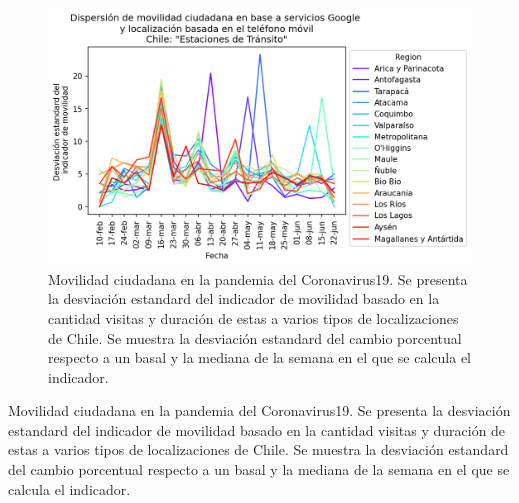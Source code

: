 \documentclass{article}
\begin{document}
\begin{figure}[H]
	\centering
	\begin{adjustbox}{width=0.8\textwidth}
		\includegraphics{./figtab/chile_DS.png} %
	\end{adjustbox}
	\caption{Movilidad ciudadana en la pandemia del Coronavirus19. Se presenta la desviación estandard del indicador de movilidad basado en la cantidad visitas y duración de estas a varios tipos de localizaciones de Chile. Se muestra la desviación estandard del cambio porcentual respecto a un basal y la mediana de la semana en el que se calcula el indicador. }
	\label{fig:movilidad chile_DS}
\end{figure}


\begin{table}[H]
	\begin{adjustbox}{width=1\textwidth}
	\end{adjustbox}
	\caption{Movilidad ciudadana en la pandemia del Coronavirus19. Se presenta la desviación estandard del indicador de movilidad basado en la cantidad visitas y duración de estas a varios tipos de localizaciones de Chile. Se muestra la desviación estandard del cambio porcentual respecto a un basal y la mediana de la semana en el que se calcula el indicador. }
	\label{tab:movilidad chile_DS}
\end{table}









\end{document}
